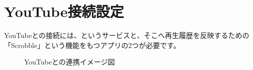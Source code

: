 \section{YouTube接続設定 }
YouTubeとの接続には、\lastfm というサービスと、そこへ再生履歴を反映するための「Scrobble」という機能をもつアプリの2つが必要です。
    \begin{figure}[htbp]
        \centering
        \caption{YouTubeとの連携イメージ図}
        \label{img:lastfm1}
    \end{figure}

    \newpage
